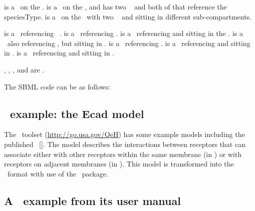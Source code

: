  is a \speciesType\ on the  \compartment.  is a \speciesType\ on the  \compartment, and has two \speciesTypeInstances\  and  both of that reference the  speciesType.  is a \speciesType\ on the  \compartment\ with two \speciesTypeInstances\  and  sitting in different sub-compartments.

 is a \species\ referencing \speciesType\ .  is a \species\ referencing .  is a \species\ referencing  and sitting in the  \compartment.  is a \species\ also referencing , but sitting in .  is a \species\ referencing .  is a \species\ referencing  and sitting in . is a \species\ referencing  and sitting in .

, , ,  and  are \fullydefinedspeciesWC.

The SBML code can be as follows:



\subsection{\Simmune\ example: the Ecad model} 
\label{def:Example:Simmune:EcadModel}

The \Simmune\  toolset (\url{http://go.usa.gov/QeH}) has some example models including the published  \model\ [\cite{ref:simmune2012}]. The  model describes the interactions between  receptors that can associate either with other  receptors within the same membrane (in ) or with  receptors on adjacent membranes (in ). This model is transformed into the \SbmlLevelThree\ format with use of the \multi\ package.\\



\subsection{A \BioNetGen\ example from its user manual}
\label{Example:BioNetGen}

